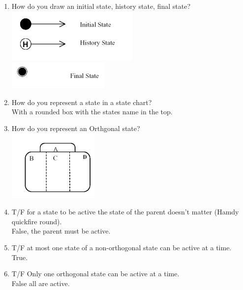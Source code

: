 \documentclass[10pt]{article}
\begin{document}
\begin{enumerate}
      \item How do you draw an initial state, history state, final state?\\
            \includegraphics*{hi.png}\\
            \includegraphics*{fianlstate.png}\\

      \item How do you represent a state in a state chart?\\
            With a rounded box with the states name in the top.\\

      \item How do you represent an Orthgonal state?\\
            \includegraphics*{orth.png}\\

      \item T/F for a state to be active the state of the parent doesn't matter (Hamdy quickfire round).\\
            False, the parent must be active.\\

      \item T/F at most one state of a non-orthogonal state can be active at a time.\\
            True.\\

      \item T/F Only one orthogonal state can be active at a time.\\
            False all are active.\\


\end{enumerate}
\end{document}
